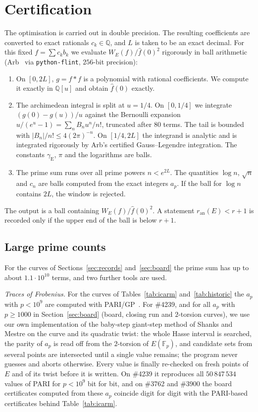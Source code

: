\documentclass[11pt]{amsart}
\theoremstyle{remark}
\theoremstyle{definition}
\newcommand{\Q}{\mathbb{Q}}
\newcommand{\ran}{r_{\mathrm{an}}}
\begin{document}
\section{Certification}\label{sec:cert}

The optimisation is carried out in double precision. The resulting coefficients are converted to exact rationals $c_k\in\Q$, and $L$ is taken to be an exact decimal. For this fixed $f=\sum c_k b_k$ we evaluate $W_E(f)/\hat f(0)^2$ rigorously in ball arithmetic (Arb~\cite{Arb} via \texttt{python-flint}, $256$-bit precision):
\begin{enumerate}
\item On $[0,2L]$, $g=f*f$ is a polynomial with rational coefficients. We compute it exactly in $\Q[u]$ and obtain $\hat f(0)$ exactly.
\item The archimedean integral is split at $u=1/4$. On $[0,1/4]$ we integrate $(g(0)-g(u))/u$ against the Bernoulli expansion $u/(e^u-1)=\sum_n B_n u^n/n!$, truncated after $80$ terms. The tail is bounded with $|B_n|/n!\le 4(2\pi)^{-n}$. On $[1/4,2L]$ the integrand is analytic and is integrated rigorously by Arb's certified Gauss--Legendre integration. The constants $\gamma_{\mathrm E}$, $\pi$ and the logarithms are balls.
\item The prime sum runs over all prime powers $n<e^{2L}$. The quantities $\log n$, $\sqrt n$ and $c_n$ are balls computed from the exact integers $a_p$. If the ball for $\log n$ contains $2L$, the window is rejected.
\end{enumerate}
The output is a ball containing $W_E(f)/\hat f(0)^2$. A statement $\ran(E)<r+1$ is recorded only if the upper end of the ball is below $r+1$.

\subsection*{Large prime counts}
For the curves of Sections~\ref{sec:records} and~\ref{sec:board} the prime sum has up to about $1.1\cdot10^{10}$ terms, and two further tools are used.

\emph{Traces of Frobenius.} For the curves of Tables~\ref{tab:icarm} and~\ref{tab:historic} the $a_p$ with $p<10^9$ are computed with PARI/GP~\cite{PARI}. For \#4239, and for all $a_p$ with $p\ge1000$ in Section~\ref{sec:board} (board, closing run and $2$-torsion curves), we use our own implementation of the baby-step giant-step method of Shanks and Mestre on the curve and its quadratic twist: the whole Hasse interval is searched, the parity of $a_p$ is read off from the $2$-torsion of $E(\mathbb F_p)$, and candidate sets from several points are intersected until a single value remains; the program never guesses and aborts otherwise. Every value is finally re-checked on fresh points of $E$ and of its twist before it is written. On \#4239 it reproduces all $50\,847\,534$ values of PARI for $p<10^9$ bit for bit, and on \#3762 and \#3900 the board certificates computed from these $a_p$ coincide digit for digit with the PARI-based certificates behind Table~\ref{tab:icarm}.
\end{document}
